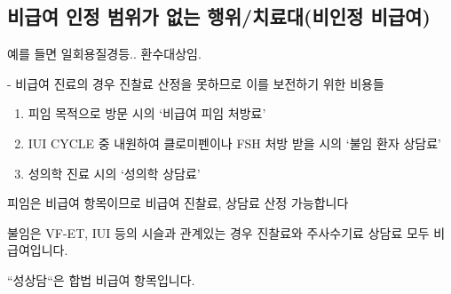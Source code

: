 \subsection{비급여 인정 범위가 없는 행위/치료대(비인정 비급여)}
예를 들면 일회용질경등.. 환수대상임.\par
- 비급여 진료의 경우 진찰료 산정을 못하므로 이를 보전하기 위한 비용들
\begin{enumerate}[①]\tightlist
\item 피임 목적으로 방문 시의 ‘비급여 피임 처방료’ 
\item IUI CYCLE 중 내원하여 클로미펜이나 FSH 처방 받을 시의 ‘불임 환자 상담료’
\item 성의학 진료 시의 ‘성의학 상담료’
\end{enumerate}

피임은 비급여 항목이므로 비급여 진찰료, 상담료 산정 가능합니다 \par
불임은 VF-ET, IUI 등의 시슬과 관계있는 경우 진찰료와 주사수기료 상담료 모두 비급여입니다.\par
“성상담“은 합법 비급여 항목입니다. 

